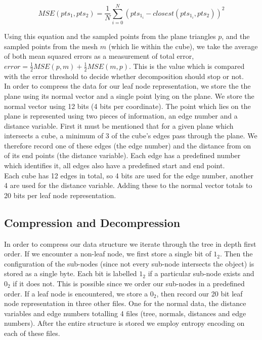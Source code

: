 \begin{equation}
 \label{eqn:MSE_1}
MSE(pts_1, pts_2) = \frac{1}{N}\sum_{i=0}^{N} (pts_{1_i} - closest(pts_{1_i}, pts_2))^2
\end{equation}

Using this equation and the sampled points from the plane triangles $p$, and the sampled points from the mesh $m$ (which lie within the cube), we take the average of both mean squared errors as a measurement of total error, $error = \frac{1}{2}MSE(p,m) + \frac{1}{2}MSE(m,p)$. This is the value which is compared with the error threshold to decide whether decomposition should stop or not. \\

In order to compress the data for our leaf node representation, we store the the plane using its normal vector and a single point lying on the plane. We store the normal vector using 12 bits (4 bits per coordinate). The point which lies on the plane is represented using two pieces of information, an edge number and a distance variable. First it must be mentioned that for a given plane which intersects a cube, a minimum of 3 of the cube's edges pass through the plane. We therefore record one of these edges (the edge number) and the distance from on of its end points (the distance variable). Each edge has a predefined number which identifies it, all edges also have a predefined start and end point. \\

Each cube has 12 edges in total, so 4 bits are used for the edge number, another 4 are used for the distance variable. Adding these to the normal vector totals to 20 bits per leaf node representation.  \\


\subsection{Compression and Decompression}

In order to compress our data structure we iterate through the tree in depth first order. If we encounter a non-leaf node, we first store a single bit of $1_2$. Then the configuration of the sub-nodes (since not every sub-node intersects the object) is stored as a single byte. Each bit is labelled $1_2$ if a particular sub-node exists and $0_2$ if it does not. This is possible since we order our sub-nodes in a predefined order. If a leaf node is encountered, we store a $0_2$, then record our 20 bit leaf node representation in three other files. One for the normal data, the distance variables and edge numbers totalling 4 files (tree, normals, distances and edge numbers). After the entire structure is stored we employ entropy encoding on each of these files. \\

